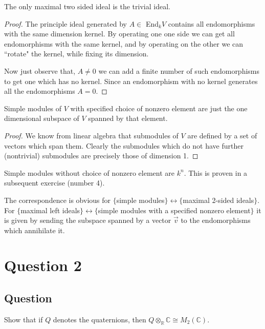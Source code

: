 \documentclass[11pt]{article}
\begin{document}
The only maximal two sided ideal is the trivial ideal.
\begin{proof}
The principle ideal generated by $A \in$ End$_k V$ contains all endomorphisms with the same dimension kernel. By operating one one side we can get all endomorphisms with the same kernel, and by operating on the other we can ``rotate" the kernel, while fixing its dimension.

Now just observe that, $A \neq 0$ we can add a finite number of such endomorphisms to get one which has no kernel. Since an endomorphism with no kernel generates all the endomorphisms $A= 0$.
\end{proof}

Simple modules of $V$ with specified choice of nonzero element are just the one dimensional subspace of $V$ spanned by that element.
\begin{proof}
We know from linear algebra that submodules of $V$ are defined by a set of vectors which span them. Clearly the submodules which do not have further (nontrivial) submodules are precisely those of dimension 1.
\end{proof}

Simple modules without choice of nonzero element are $k^n$. This is proven in a subsequent exercise (number 4). 

The correspondence is obvious for  $\{$simple modules$\} \leftrightarrow \{$maximal 2-sided ideals$\}$. For   $\{$maximal left ideals$\} \leftrightarrow \{$simple modules with a specified nonzero element$\}$ it is given by sending the subspace spanned by a vector $\vec{v}$ to the endomorphisms which annihilate it.

\section{Question 2}
\subsection{Question}
Show that if $Q$ denotes the quaternions, then $Q \otimes_\mathbb{R} \mathbb{C} \cong M_2 (\mathbb{C}).$
\end{document}
